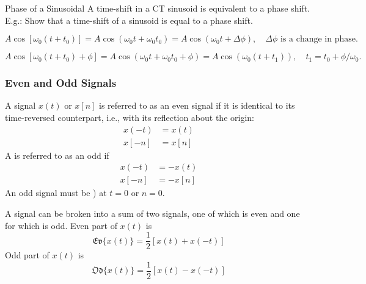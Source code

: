\begin{frame}[plain]{Phase of a Sinusoidal}
    A time-shift in a CT sinusoid is equivalent to a phase shift.\\
    E.g.: Show that a time-shift of a sinusoid is equal to a phase shift.
    {
        \begin{equation*}
            A\cos[\omega_0(t + t_0)] = A\cos(\omega_0t + \omega_0t_0) = A\cos(\omega_0t + \Delta\phi),\quad \Delta\phi \text{ is a change in phase}.
        \end{equation*}

        \begin{equation*}
            A\cos[\omega_0(t + t_0) + \phi] = A\cos(\omega_0t + \omega_0t_0 + \phi) = A\cos(\omega_0(t + t_1)),\quad t_1 = t_0 + \phi/\omega_0.
        \end{equation*}
    }
\end{frame}

\begin{frame}[t]
\frametitle{Even and Odd Signals}
    A signal $x(t)$ or $x[n]$ is referred to as an \alert{even} signal if it is identical to its time-reversed counterpart, i.e., with its reflection about the origin:
    \begin{align*}
        x(-t) &= x(t)\\
        x[-n] &= x[n]
    \end{align*}
    A is referred to as an \alert{odd} if
    \begin{align*}
        x(-t) &= -x(t)\\
        x[-n] &= -x[n]
    \end{align*}
    An odd signal must be ) at $t=0$ or $n=0$.

    A signal can be broken into a sum of two signals, one of which is even and one for which is odd.
    Even part of $x(t)$ is
    \begin{equation*}
        \mathfrak{Ev}\{x(t)\} = \frac{1}{2}[x(t)+x(-t)]
    \end{equation*}
    Odd part of $x(t)$ is
    \begin{equation*}
        \mathfrak{Od}\{x(t)\} = \frac{1}{2}[x(t)-x(-t)]
    \end{equation*}
\end{frame}

